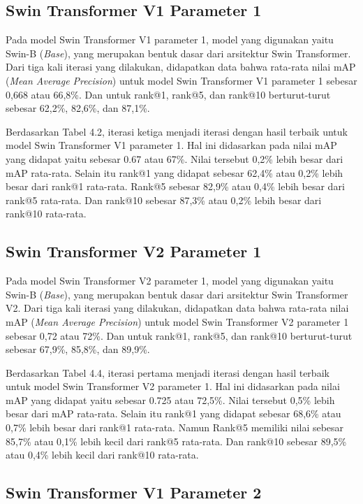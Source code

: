 \subsection{Swin Transformer V1 Parameter 1}

Pada model Swin Transformer V1 parameter 1, model yang digunakan yaitu Swin-B (\emph{Base}), yang merupakan bentuk 
dasar dari arsitektur Swin Transformer. Dari tiga kali iterasi yang dilakukan, didapatkan data bahwa rata-rata nilai 
mAP (\emph{Mean Average Precision}) untuk model Swin Transformer V1 parameter 1 sebesar 0,668 atau 66,8\%. Dan untuk 
rank@1, rank@5, dan rank@10 berturut-turut sebesar 62,2\%, 82,6\%, dan 87,1\%. 

Berdasarkan Tabel 4.2, iterasi ketiga menjadi iterasi dengan hasil terbaik untuk model Swin Transformer V1 parameter 1. 
Hal ini didasarkan pada nilai mAP yang didapat yaitu sebesar 0.67 atau 67\%. Nilai tersebut 0,2\% lebih besar dari 
mAP rata-rata. Selain itu rank@1 yang didapat sebesar 62,4\% atau 0,2\% lebih besar dari rank@1 rata-rata. Rank@5 sebesar 
82,9\% atau 0,4\% lebih besar dari rank@5 rata-rata. Dan rank@10 sebesar 87,3\% atau 0,2\% lebih besar dari rank@10 
rata-rata.

\subsection{Swin Transformer V2 Parameter 1}

Pada model Swin Transformer V2 parameter 1, model yang digunakan yaitu Swin-B (\emph{Base}), yang merupakan bentuk 
dasar dari arsitektur Swin Transformer V2. Dari tiga kali iterasi yang dilakukan, didapatkan data bahwa rata-rata nilai 
mAP (\emph{Mean Average Precision}) untuk model Swin Transformer V2 parameter 1 sebesar 0,72 atau 72\%. Dan untuk 
rank@1, rank@5, dan rank@10 berturut-turut sebesar 67,9\%, 85,8\%, dan 89,9\%. 

Berdasarkan Tabel 4.4, iterasi pertama menjadi iterasi dengan hasil terbaik untuk model Swin Transformer V2 parameter 1. 
Hal ini didasarkan pada nilai mAP yang didapat yaitu sebesar 0.725 atau 72,5\%. Nilai tersebut 0,5\% lebih besar dari 
mAP rata-rata. Selain itu rank@1 yang didapat sebesar 68,6\% atau 0,7\% lebih besar dari rank@1 rata-rata. Namun 
Rank@5 memiliki nilai sebesar 85,7\% atau 0,1\% lebih kecil dari rank@5 rata-rata. Dan rank@10 sebesar 89,5\% atau 0,4\% 
lebih kecil dari rank@10 rata-rata.

\subsection{Swin Transformer V1 Parameter 2}

